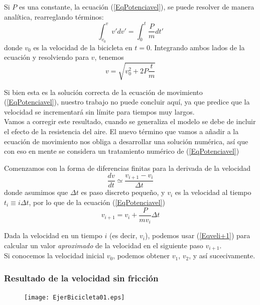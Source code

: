 \begin{frame}
Si $P$ es una constante, la ecuaci\'{o}n (\ref{EqPotenciavel}), se puede resolver de manera anal\'{i}tica, rearreglando t\'{e}rminos:
\begin{equation}\label{EqIntegral}
\int_{v_{0}}^{v} v' dv' = \int_{0}^{t} \dfrac{P}{m} dt'
\end{equation}
donde $v_{0}$ es la velocidad de la bicicleta en $t=0$. Integrando ambos lados de la ecuaci\'{o}n y resolviendo para $v$, tenemos
\begin{equation}\label{Eqvres}
v = \sqrt{v_{0}^{2} + 2 P \dfrac{t}{m}}
\end{equation}
\end{frame}
\begin{frame}
Si bien esta es la soluci\'{o}n correcta de la ecuación de movimiento (\ref{EqPotenciavel}), nuestro trabajo no puede concluir aqu\'{i}, ya que predice que la velocidad se incrementar\'{a} sin l\'{i}mite para tiempos muy largos.
\\
\medskip
Vamos a corregir este resultado, cuando se generaliza el modelo se debe de incluir el efecto de la resistencia del aire. El nuevo t\'{e}rmino que vamos a añadir a la ecuaci\'{o}n de movimiento nos obliga a desarrollar una solución num\'{e}rica, as\'{i} que con eso en mente se considera un tratamiento numérico de (\ref{EqPotenciavel})
\end{frame}
\begin{frame}
Comenzamos con la forma de diferencias finitas para la derivada de la velocidad
\begin{equation}\label{Eqderivada}
\dfrac{dv}{dt} \simeq \dfrac{v_{i+1}-v_{i}}{\Delta t}
\end{equation}
donde asumimos que $\Delta t$ es paso discreto pequeño, y $v_{i}$ es la velocidad al tiempo $t_{i} \equiv i \Delta t$, por lo que de la ecuaci\'{o}n (\ref{EqPotenciavel})
\begin{equation}\label{Eqveli+1}
v_{i+1} = v_{i} + \dfrac{P}{m v_{i}} \Delta t
\end{equation}
\end{frame}
\begin{frame}
Dada la velocidad en un tiempo $i$ (es decir, $v_{i}$), podemos usar (\ref{Eqveli+1}) para calcular un valor \textit{aproximado} de la velocidad en el siguiente paso $v_{i+1}$.
\\
\medskip
Si conocemos la velocidad inicial $v_{0}$, podemos obtener $v_{1}$, $v_{2}$, y as\'{i} sucecivamente.
\end{frame}
\begin{frame}
\frametitle{Resultado de la velocidad sin fricci\'{o}n}
\begin{figure}
	\centering
	\texttt{[image: EjerBicicleta01.eps]}
\end{figure}
\end{frame}
